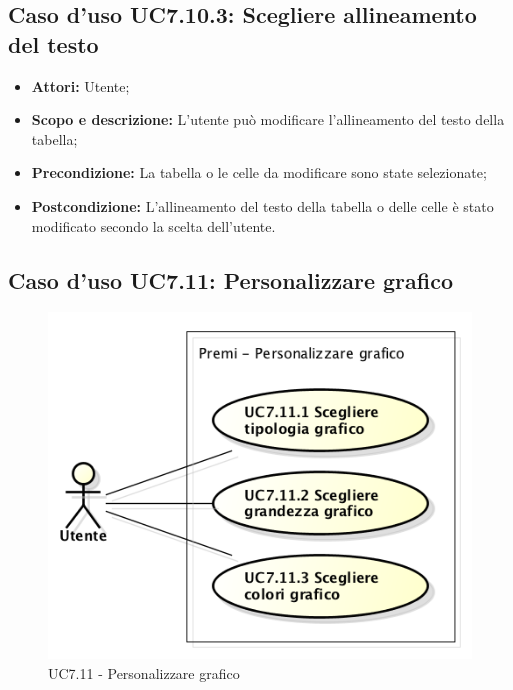 \subsection{Caso d'uso UC7.10.3: Scegliere allineamento del testo}
\begin{itemize}
	\item \textbf{Attori:} Utente;
	\item \textbf{Scopo e descrizione:} L'utente può modificare l'allineamento del testo della tabella;
	\item \textbf{Precondizione:} La tabella o le celle da modificare sono state selezionate;
	\item \textbf{Postcondizione:} L'allineamento del testo della tabella o delle celle è stato modificato secondo la scelta dell'utente.
\end{itemize}


\subsection{Caso d'uso UC7.11: Personalizzare grafico}
\begin{figure}[h] 
	\centering 
	\includegraphics[scale=0.45] {img/UC7.11.png} 
	\caption{UC7.11 - Personalizzare grafico} 
\end{figure}

